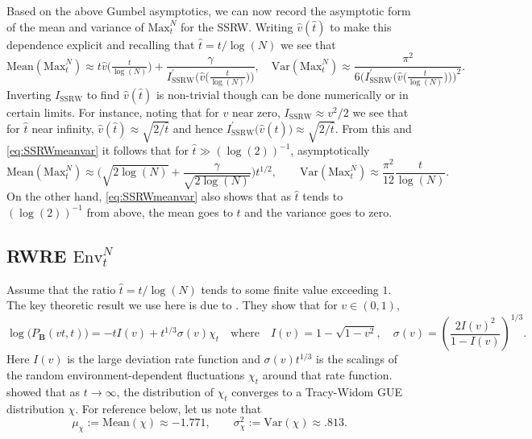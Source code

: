 \documentclass[letter,reqno, 11pt, oneside]{amsart}
\newcommand{\envnt}{\text{Env}_t^N}
\def\maxnt{\mathrm{Max}^{N}_t}
\newcommand{\mean}[1]{\mathrm{Mean}\left(#1\right)}
\newcommand{\var}[1]{\mathrm{Var}\left(#1\right)}
\begin{document}
Based on the above Gumbel asymptotics, we can now record the asymptotic form of the mean and variance of $\maxnt$ for the SSRW. Writing $\hat{v}(\hat{t})$ to make this dependence explicit and recalling that $\hat{t}= t/\log(N)$ we see that
\begin{equation}\label{eq:SSRWmeanvar}
\mean{\maxnt}\approx t\hat v\big(\tfrac{t}{\log(N)}\big) +  \frac{\gamma}{I_{\mathrm{SSRW}}^{\prime}\Big(\hat v\big(\frac{t}{\log(N)}\big)\Big)} ,\quad \var{\maxnt}\approx
 \frac{\pi^2}{ 6 \Big(I_{\mathrm{SSRW}}^{\prime}\Big(\hat v\big(\frac{t}{\log(N)}\big)\Big)\Big)^2}.
\end{equation}
Inverting $I_{\mathrm{SSRW}}$ to find $\hat v(\hat{t})$ is non-trivial though can be done numerically or in certain limits. For instance, noting that for $v$ near zero, $I_{\mathrm{SSRW}}\approx v^2/2$  we see that for $\hat{t}$ near infinity,  $\hat{v}(\hat{t})\approx \sqrt{2/\hat{t}}$ and hence
$I_{\mathrm{SSRW}}^{\prime}\big(\hat v(\hat{t})\big)\approx \sqrt{2/\hat{t}}$. From this and \eqref{eq:SSRWmeanvar} it follows that for $\hat{t}\gg  (\log(2))^{-1}$, asymptotically
$$
\mean{\maxnt}\approx \Big(\sqrt{2 \log(N)} + \frac{\gamma}{\sqrt{2 \log(N)}}\Big) t^{1/2},\qquad
\var{\maxnt}\approx \frac{\pi^2}{12}\frac{t}{\log(N)}.
$$
On the other hand, \eqref{eq:SSRWmeanvar} also shows that as $\hat{t}$ tends to $ (\log(2))^{-1}$ from above, the mean goes to $t$ and the variance goes to zero.

\subsection{RWRE $\envnt$}\label{sec:RWREenv}
Assume that the ratio $\hat{t} = t/\log(N)$ tends to some finite value exceeding $1$. The key theoretic result we use  here is due to \cite{barraquandRandomwalkBetadistributedRandom2017a}. They show that for $v\in (0,1)$,
\begin{equation}\label{eq:bc}
\log\big(P_{\mathbf{B}}(vt,t)\big) = - t I(v)  + t^{1/3} \sigma(v)\chi_{t}\quad \textrm{where}\quad I(v) = 1- \sqrt{1- v^2},\quad\sigma(v) = \left(\frac{2 I(v)^2}{1-I(v)}\right)^{1/3}.
\end{equation}
Here $I(v)$ is the large deviation rate function and $\sigma(v) t^{1/3}$ is the scalings of the random environment-dependent fluctuations $\chi_t$ around that rate function. \cite{barraquandRandomwalkBetadistributedRandom2017a} showed that as $t\to\infty$, the distribution of $\chi_t$ converges to a Tracy-Widom GUE distribution $\chi$. For reference below, let us note that \cite{prahoferUniversalDistributionsGrowth2000}
$$
\mu_\chi := \mean{\chi} \approx -1.771,\qquad \sigma_{\chi}^2 := \var{\chi}\approx .813.
$$
\end{document}
